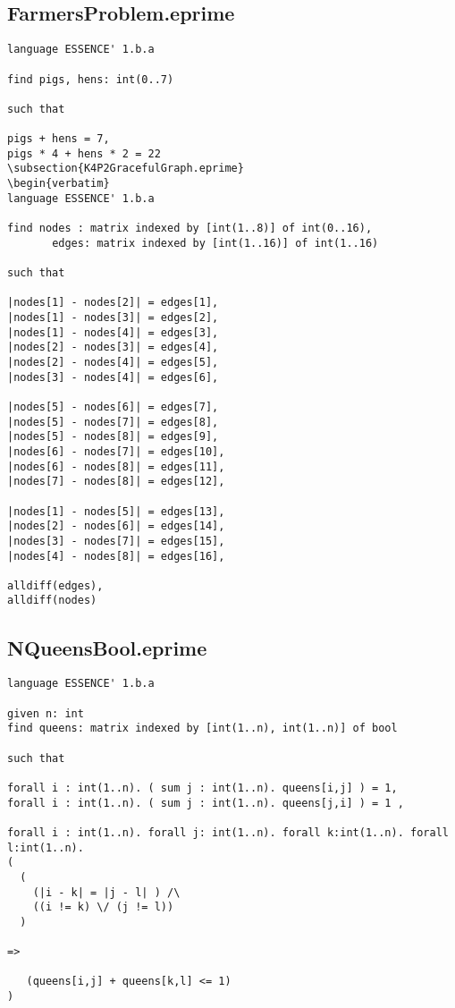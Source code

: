 \documentclass{article}
\begin{document}
\subsection{FarmersProblem.eprime}
\begin{verbatim}
language ESSENCE' 1.b.a

find pigs, hens: int(0..7)

such that

pigs + hens = 7,
pigs * 4 + hens * 2 = 22
\subsection{K4P2GracefulGraph.eprime}
\begin{verbatim}
language ESSENCE' 1.b.a

find nodes : matrix indexed by [int(1..8)] of int(0..16),
       edges: matrix indexed by [int(1..16)] of int(1..16)

such that

|nodes[1] - nodes[2]| = edges[1],
|nodes[1] - nodes[3]| = edges[2],
|nodes[1] - nodes[4]| = edges[3],
|nodes[2] - nodes[3]| = edges[4],
|nodes[2] - nodes[4]| = edges[5],
|nodes[3] - nodes[4]| = edges[6],

|nodes[5] - nodes[6]| = edges[7],
|nodes[5] - nodes[7]| = edges[8],
|nodes[5] - nodes[8]| = edges[9],
|nodes[6] - nodes[7]| = edges[10],
|nodes[6] - nodes[8]| = edges[11],
|nodes[7] - nodes[8]| = edges[12],

|nodes[1] - nodes[5]| = edges[13],
|nodes[2] - nodes[6]| = edges[14],
|nodes[3] - nodes[7]| = edges[15],
|nodes[4] - nodes[8]| = edges[16],

alldiff(edges),
alldiff(nodes)
\end{verbatim}
\subsection{NQueensBool.eprime}
\begin{verbatim}
language ESSENCE' 1.b.a

given n: int
find queens: matrix indexed by [int(1..n), int(1..n)] of bool

such that

forall i : int(1..n). ( sum j : int(1..n). queens[i,j] ) = 1,
forall i : int(1..n). ( sum j : int(1..n). queens[j,i] ) = 1 ,

forall i : int(1..n). forall j: int(1..n). forall k:int(1..n). forall l:int(1..n).
(
  ( 
    (|i - k| = |j - l| ) /\ 
    ((i != k) \/ (j != l)) 
  ) 

=> 

   (queens[i,j] + queens[k,l] <= 1)
)
\end{verbatim}
\end{document}
